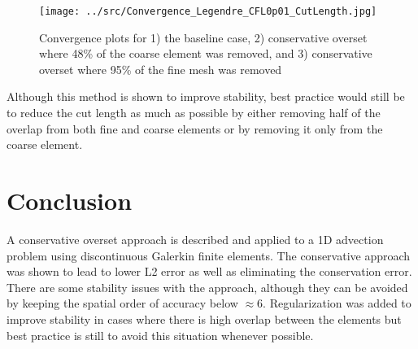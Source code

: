 \documentclass[11pt]{article}
\begin{document}
\begin{figure}
\centering
  \texttt{[image: ../src/Convergence\_Legendre\_CFL0p01\_CutLength.jpg]}
  \caption{Convergence plots for 1) the baseline case, 2) conservative overset where 48\% of the coarse element was removed, and 3) conservative overset where 95\% of the fine mesh was removed}
  \label{fig:reg}
\end{figure}

Although this method is shown to improve stability, best practice would still be to reduce
the cut length as much as possible by either removing half of the overlap from both
fine and coarse elements or by removing it only from the coarse element. 

\section{Conclusion}
A conservative overset approach is described and applied to a 1D advection problem using
discontinuous Galerkin finite elements. The conservative approach was shown to lead to lower
L2 error as well as eliminating the conservation error. There are some stability issues with 
the approach, although they can be avoided by keeping the spatial order of accuracy below $\approx 6$. 
Regularization was added to improve stability in cases where there is high overlap between
the elements but best practice is still to avoid this situation whenever possible. 
\end{document}
